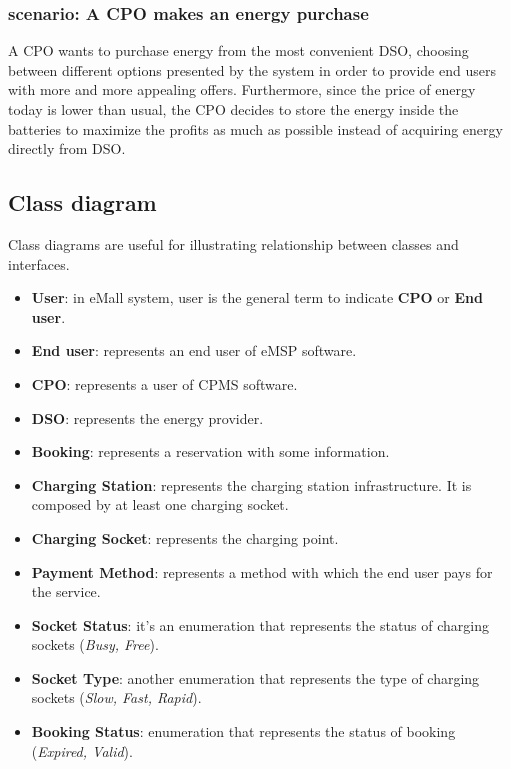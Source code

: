 \subsubsection{ scenario: A CPO makes an energy purchase}
\label{sec:explsaving}
A CPO wants to purchase energy from the most convenient DSO, choosing between different options presented by the system in order to provide end users with more and more appealing offers. Furthermore, since the price of energy today is lower than usual, the CPO decides to store the energy inside the batteries to maximize the profits as much as possible instead of acquiring energy directly from DSO.
\subsection{Class diagram}
Class diagrams are useful for illustrating relationship between classes and interfaces.
\begin{itemize}
    \item \textbf{User}: in eMall system, user is the general term to indicate \textbf{CPO} or \textbf{End user}.
    \item \textbf{End user}: represents an end user of eMSP software.
    \item \textbf{CPO}: represents a user of CPMS software.
    \item \textbf{DSO}: represents the energy provider.
    \item \textbf{Booking}: represents a reservation with some information.
    \item \textbf{Charging Station}: represents the charging station infrastructure. It is composed by at least one charging socket.
    \item \textbf{Charging Socket}: represents the charging point.
    \item \textbf{Payment Method}: represents a method with which the end user pays for the service.
    \item \textbf{Socket Status}: it's an enumeration that represents the status of charging sockets (\textit{Busy, Free}).
    \item \textbf{Socket Type}: another enumeration that represents the type of charging sockets (\textit{Slow, Fast, Rapid}).
    \item \textbf{Booking Status}: enumeration that represents the status of booking (\textit{Expired, Valid}).
\end{itemize} 
